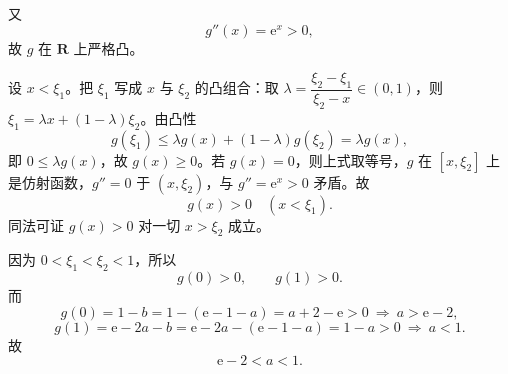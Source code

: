 \begin{answer}
又
\nopagebreak[4]
\[g''(x)=\mathrm e^x>0,\]
故 $g$ 在 $\mathbf R$ 上严格凸。

设 $x<\xi_1$。把 $\xi_1$ 写成 $x$ 与 $\xi_2$ 的凸组合：取 $\lambda=\dfrac{\xi_2-\xi_1}{\xi_2-x}\in(0,1)$，则 $\xi_1=\lambda x+(1-\lambda)\xi_2$。由凸性
\nopagebreak[4]
\[g(\xi_1)\leqslant\lambda g(x)+(1-\lambda)g(\xi_2)=\lambda g(x),\]
即 $0\leqslant\lambda g(x)$，故 $g(x)\geqslant0$。若 $g(x)=0$，则上式取等号，$g$ 在 $[x,\xi_2]$ 上是仿射函数，$g''=0$ 于 $(x,\xi_2)$，与 $g''=\mathrm e^x>0$ 矛盾。故
\nopagebreak[4]
\[g(x)>0\quad(x<\xi_1).\]
同法可证 $g(x)>0$ 对一切 $x>\xi_2$ 成立。

因为 $0<\xi_1<\xi_2<1$，所以
\nopagebreak[4]
\[g(0)>0,\qquad g(1)>0 .\]
而
\nopagebreak[4]
\[g(0)=1-b=1-(\mathrm e-1-a)=a+2-\mathrm e>0\ \Longrightarrow\ a>\mathrm e-2,\]
\nopagebreak[4]
\[g(1)=\mathrm e-2a-b=\mathrm e-2a-(\mathrm e-1-a)=1-a>0\ \Longrightarrow\ a<1 .\]
故
\nopagebreak[4]
\[\mathrm e-2<a<1 .\]



\end{answer}
